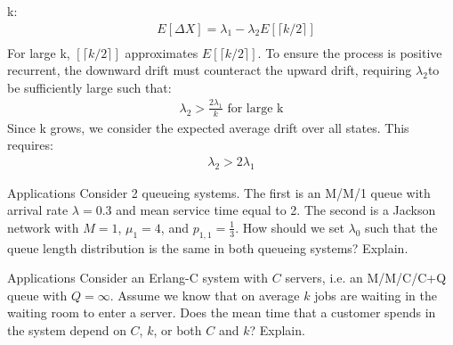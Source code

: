 \begin{solution}
    k:
    \begin{align*}
        &E[\Delta X]=\lambda_1-\lambda_2 E[\lceil k/2 \rceil]\\
    \end{align*}
    For large k, $[\lceil k/2 \rceil]$ approximates $E[\lceil k/2 \rceil]$.
    To ensure the process is positive recurrent, the downward drift must counteract the upward drift, requiring $\lambda_2$to be sufficiently large such that:
    \begin{align*}
        \lambda_2 > \frac{2\lambda_1}{k} \text{ for large k}
    \end{align*}
    Since k grows, we consider the expected average drift over all states. This requires:
    \begin{align*}
        \lambda_2 > 2\lambda_1
    \end{align*}
\end{solution}
\begin{problem}{Applications}
Consider 2 queueing systems. The first is an M/M/1 queue with arrival rate \( \lambda = 0.3 \) and mean service time equal to 2. The second is a Jackson network with \( M = 1 \), \( \mu_1 = 4 \), and \( p_{1,1} = \frac{1}{3} \). How should we set \( \lambda_0 \) such that the queue length distribution is the same in both queueing systems? Explain.
\end{problem}

\begin{problem}{Applications}
Consider an Erlang-C system with \( C \) servers, i.e. an M/M/C/C+Q queue with \( Q = \infty \). Assume we know that on average \( k \) jobs are waiting in the waiting room to enter a server. Does the mean time that a customer spends in the system depend on \( C \), \( k \), or both \( C \) and \( k \)? Explain.
\end{problem}
